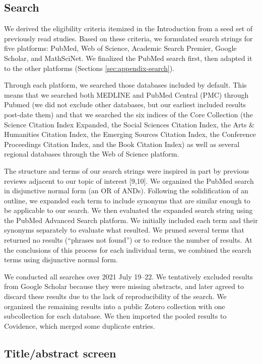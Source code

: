 \documentclass[preprint, 3p,
authoryear]{elsarticle} %
\begin{document}
\hypertarget{search}{%
\subsection{Search}\label{search}}

We derived the eligibility criteria itemized in the Introduction from a
seed set of previously read studies. Based on these criteria, we
formulated search strings for five platforms: PubMed, Web of Science,
Academic Search Premier, Google Scholar, and MathSciNet. We finalized
the PubMed search first, then adapted it to the other platforms
(Sections \ref{sec:appendix-search}).

Through each platform, we searched those databases included by default.
This means that we searched both MEDLINE and PubMed Central (PMC)
through Pubmed (we did not exclude other databases, but our earliest
included results post-date them) and that we searched the six indices of
the Core Collection (the Science Citation Index Expanded, the Social
Sciences Citation Index, the Arts \& Humanities Citation Index, the
Emerging Sources Citation Index, the Conference Proceedings Citation
Index, and the Book Citation Index) as well as several regional
databases through the Web of Science platform.

The structure and terms of our search strings were inspired in part by
previous reviews adjacent to our topic of interest {[}9,10{]}. We
organized the PubMed search in disjunctive normal form (an OR of ANDs).
Following the solidification of an outline, we expanded each term to
include synonyms that are similar enough to be applicable to our search.
We then evaluated the expanded search string using the PubMed Advanced
Search platform. We initially included each term and their synonyms
separately to evaluate what resulted. We pruned several terms that
returned no results (``phrases not found'') or to reduce the number of
results. At the conclusions of this process for each individual term, we
combined the search terms using disjunctive normal form.

We conducted all searches over 2021 July 19--22. We tentatively excluded
results from Google Scholar because they were missing abstracts, and
later agreed to discard these results due to the lack of reproducibility
of the search. We organized the remaining results into a public Zotero
collection with one subcollection for each database. We then imported
the pooled results to Covidence, which merged some duplicate entries.

\hypertarget{titleabstract-screen}{%
\subsection{Title/abstract screen}\label{titleabstract-screen}}
\end{document}
